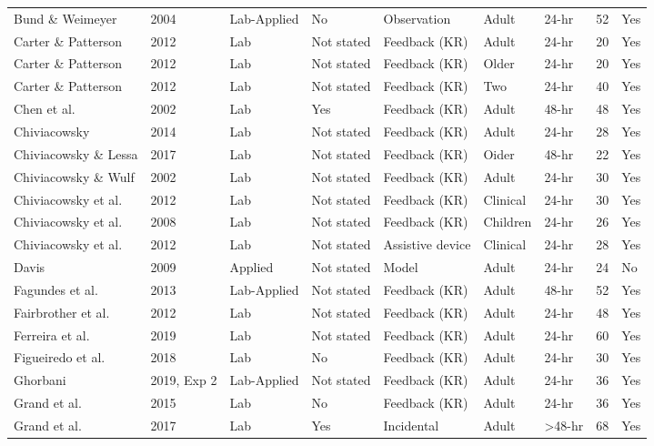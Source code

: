 \documentclass[
  english,
  man,floatsintext]{apa7}
\begin{document}
\begin{landscape}
\begin{ThreePartTable}
\begin{longtable}[l]{lllllllrl}
\addlinespace
Bund \& Weimeyer & 2004 & Lab-Applied & No & Observation & Adult & 24-hr & 52 & Yes\\
\addlinespace
Carter \& Patterson & 2012 & Lab & Not stated & Feedback (KR) & Adult & 24-hr & 20 & Yes\\
\addlinespace
Carter \& Patterson & 2012 & Lab & Not stated & Feedback (KR) & Older & 24-hr & 20 & Yes\\
\addlinespace
Carter \& Patterson & 2012 & Lab & Not stated & Feedback (KR) & Two & 24-hr & 40 & Yes\\
\addlinespace
Chen et al. & 2002 & Lab & Yes & Feedback (KR) & Adult & 48-hr & 48 & Yes\\
\addlinespace
Chiviacowsky & 2014 & Lab & Not stated & Feedback (KR) & Adult & 24-hr & 28 & Yes\\
\addlinespace
Chiviacowsky \& Lessa & 2017 & Lab & Not stated & Feedback (KR) & Oider & 48-hr & 22 & Yes\\
\addlinespace
Chiviacowsky \& Wulf & 2002 & Lab & Not stated & Feedback (KR) & Adult & 24-hr & 30 & Yes\\
\addlinespace
Chiviacowsky et al. & 2012 & Lab & Not stated & Feedback (KR) & Clinical & 24-hr & 30 & Yes\\
\addlinespace
Chiviacowsky et al. & 2008 & Lab & Not stated & Feedback (KR) & Children & 24-hr & 26 & Yes\\
\addlinespace
Chiviacowsky et al. & 2012 & Lab & Not stated & Assistive device & Clinical & 24-hr & 28 & Yes\\
\addlinespace
Davis & 2009 & Applied & Not stated & Model & Adult & 24-hr & 24 & No\\
\addlinespace
Fagundes et al. & 2013 & Lab-Applied & Not stated & Feedback (KR) & Adult & 48-hr & 52 & Yes\\
\addlinespace
Fairbrother et al. & 2012 & Lab & Not stated & Feedback (KR) & Adult & 24-hr & 48 & Yes\\
\addlinespace
Ferreira et al. & 2019 & Lab & Not stated & Feedback (KR) & Adult & 24-hr & 60 & Yes\\
\addlinespace
Figueiredo et al. & 2018 & Lab & No & Feedback (KR) & Adult & 24-hr & 30 & Yes\\
\addlinespace
Ghorbani & 2019, Exp 2 & Lab-Applied & Not stated & Feedback (KR) & Adult & 24-hr & 36 & Yes\\
\addlinespace
Grand et al. & 2015 & Lab & No & Feedback (KR) & Adult & 24-hr & 36 & Yes\\
\addlinespace
Grand et al. & 2017 & Lab & Yes & Incidental & Adult & >48-hr & 68 & Yes\\

\end{longtable}
\end{ThreePartTable}
\end{landscape}
\end{document}
